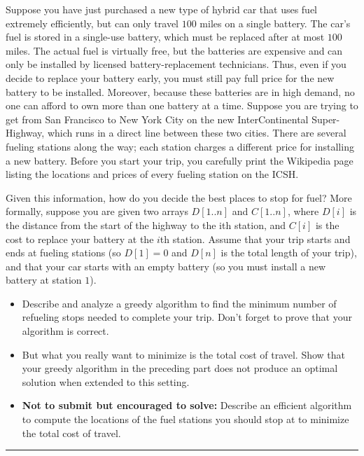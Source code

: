 \documentclass[11pt]{article}
\begin{document}

Suppose you have just purchased a new type of hybrid car that
  uses fuel extremely efficiently, but can only travel $100$ miles on a
  single battery. The car’s fuel is stored in a single-use battery,
  which must be replaced after at most $100$ miles. The actual fuel is
  virtually free, but the batteries are expensive and can only be
  installed by licensed battery-replacement technicians. Thus, even if
  you decide to replace your battery early, you must still pay full
  price for the new battery to be installed. Moreover, because these
  batteries are in high demand, no one can afford to own more than one
  battery at a time.  Suppose you are trying to get from San Francisco
  to New York City on the new InterContinental Super-Highway, which
  runs in a direct line between these two cities. There are several
  fueling stations along the way; each station charges a different
  price for installing a new battery. Before you start your trip, you
  carefully print the Wikipedia page listing the locations and prices
  of every fueling station on the ICSH.

  Given this information, how do
  you decide the best places to stop for fuel?  More formally, suppose
  you are given two arrays $D[1 .. n]$ and $C[1 .. n]$, where $D[i]$ is the
  distance from the start of the highway to the ith station, and $C[i]$
  is the cost to replace your battery at the $i$th station. Assume that
  your trip starts and ends at fueling stations (so $D[1] = 0$ and $D[n]$
  is the total length of your trip), and that your car starts with an
  empty battery (so you must install a new battery at station $1$).


  \begin{itemize}
  \item   Describe and analyze a greedy algorithm to find the minimum number
  of refueling stops needed to complete your trip. Don’t forget to
  prove that your algorithm is correct.
\item But what you really want
  to minimize is the total cost of travel. Show that your greedy
  algorithm in the preceding part does not produce an optimal solution when
  extended to this setting.
\item {\bf Not to submit but encouraged to solve:} Describe an efficient algorithm to
  compute the locations of the fuel stations you should stop at to
  minimize the total cost of travel.
  \end{itemize}
\hrule
\end{document}
